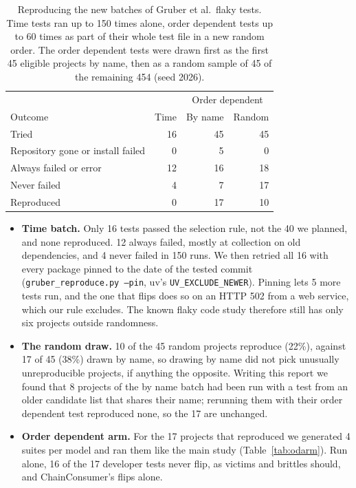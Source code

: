 \begin{table}[htbp]
\caption{Reproducing the new batches of Gruber et al.\ flaky tests. Time tests ran up to 150 times alone, order dependent tests up to 60 times as part of their whole test file in a new random order. The order dependent tests were drawn first as the first 45 eligible projects by name, then as a random sample of 45 of the remaining 454 (seed 2026).}
\label{tab:batches}
\small
\setlength{\tabcolsep}{3pt}
\begin{tabular}{lrrr}
\toprule
 & & \multicolumn{2}{c}{Order dependent} \\
Outcome & Time & By name & Random \\
\midrule
Tried & 16 & 45 & 45 \\
\quad Repository gone or install failed & 0 & 5 & 0 \\
\quad Always failed or error & 12 & 16 & 18 \\
\quad Never failed & 4 & 7 & 17 \\
\quad Reproduced & 0 & 17 & 10 \\
\bottomrule
\end{tabular}
\end{table}

\begin{itemize}
\item \textbf{Time batch.} Only 16 tests passed the selection rule, not the 40 we planned, and none reproduced. 12 always failed, mostly at collection on old dependencies, and 4 never failed in 150 runs. We then retried all 16 with every package pinned to the date of the tested commit (\texttt{gruber\_reproduce.py --pin}, uv's \texttt{UV\_EXCLUDE\_NEWER}). Pinning lets 5 more tests run, and the one that flips does so on an HTTP 502 from a web service, which our rule excludes. The known flaky code study therefore still has only six projects outside randomness.
\item \textbf{The random draw.} 10 of the 45 random projects reproduce (22\%), against 17 of 45 (38\%) drawn by name, so drawing by name did not pick unusually unreproducible projects, if anything the opposite. Writing this report we found that 8 projects of the by name batch had been run with a test from an older candidate list that shares their name; rerunning them with their order dependent test reproduced none, so the 17 are unchanged.
\item \textbf{Order dependent arm.} For the 17 projects that reproduced we generated 4 suites per model and ran them like the main study (Table~\ref{tab:odarm}). Run alone, 16 of the 17 developer tests never flip, as victims and brittles should, and ChainConsumer's flips alone.
\end{itemize}

